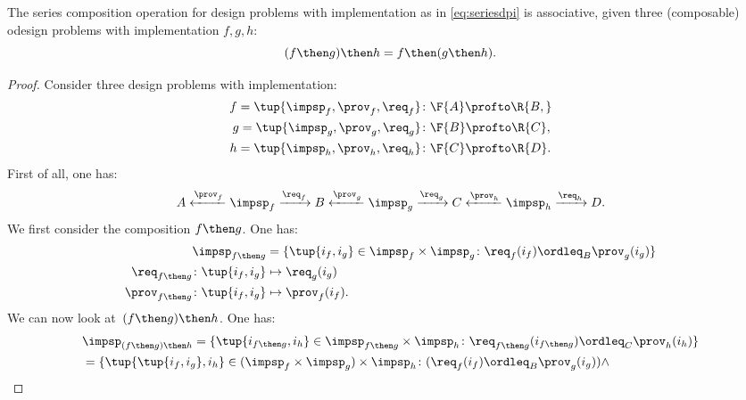 {\begin{lemma}
  The series composition operation for design problems with implementation as in \cref{eq:seriesdpi} is associative, \ie  given three (composable) odesign problems with implementation $f,g,h$:
  \begin{equation}
  (f\then g)
    \then h = f\then (g\then h).
  \end{equation}
\end{lemma}
\begin{proof}
  Consider three design problems with implementation:
  \begin{equation}
    \begin{aligned}
      f=\tup{{\impsp_f, \prov_f, \req_f} }&\colon \F{A} \profto\R{B,}\\
      g=\tup{\impsp_g, \prov_g, \req_g}&\colon \F{B} \profto \R{C},\\
      h=\tup{\impsp_h, \prov_h, \req_h}&\colon \F{C} \profto \R{D}.
    \end{aligned}
  \end{equation}
  First of all, one has:
  \begin{equation}
    A \xleftarrow{\prov_f} \impsp_f \xrightarrow{\req_f} B
    \xleftarrow{\prov_g} \impsp_g \xrightarrow{\req_g} C
    \xleftarrow{\prov_h} \impsp_h \xrightarrow{\req_h} D.
  \end{equation}
  We first consider the composition $f\then g$. One has:
  \begin{equation}
    \begin{aligned}
      \impsp_{f\then g} &= \{
      \tup{i_f,i_g} \in \impsp_f \times \impsp_g \colon
      \req_f(i_f) \ordleq_{B} \prov_g(i_g)
      \}\\
      \req_{f\then g}  \colon  \tup{i_f,i_g} &\mapsto \req_g(i_g) \\
      \prov_{f\then g}  \colon  \tup{i_f,i_g} &\mapsto \prov_f(i_f).
    \end{aligned}
  \end{equation}
  We can now look at~$(f\then g)\then h$. One has:
  \begin{equation}
    \begin{aligned}
      &\impsp_{(f\then g)\then h} = \{
      \tup{i_{f\then g},i_h} \in \impsp_{f\then g} \times \impsp_{h}\colon
      \req_{f\then g}(i_{f\then g}) \ordleq_{C} \prov_h(i_h)
      \}\\
      &=\{
      \tup{\tup{i_f, i_g},i_h} \in (\impsp_f \times \impsp_g) \times \impsp_{h}\colon
      (\req_f(i_f) \ordleq_{B} \prov_g(i_g))
      \wedge

\end{aligned}
\end{equation}
\end{proof}}
